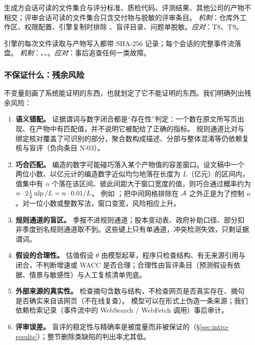 \begin{invariant}[信息隔离]
\label{inv:isolation}
生成方会话可读的文件集合与评分标准、质检代码、评测结果、其他公司的产物不相交；评审会话可读的文件集合只含交付物与脱敏的评审条目。
\emph{机制}：仓库外工作区、权限配置、引擎复制时排除 、盲评目录、问题单脱敏。\emph{应对}：T8、T9。
\end{invariant}

\begin{invariant}[可审计]
\label{inv:audit}
引擎的每次文件读取与产物写入都带 SHA-256 记录；每个会话的完整事件流落盘。
\emph{机制}：、、。\emph{应对}：事后追查任何一类故障。
\end{invariant}

\subsubsection{不保证什么：残余风险}
不变量刻画了系统能证明的东西，也就划定了它不能证明的东西。我们明确列出残余风险：

\begin{enumerate}[label=(R\arabic*)]
\item \textbf{语义错配。} 证据谓词与数字闭合都是“存在性”判定：一个数在原文所写页出现、在产物中有匹配值，并不说明它被配给了正确的指标。
      规则通道比对与绑定核对覆盖了可识别的部分，聚合数构成描述、分部与整体混淆等仍依赖复核与盲评（负向条目 N-03）。
\item \textbf{巧合匹配。} 编造的数字可能碰巧落入某个产物值的容差窗口。设文稿中一个两位小数、以亿元计的编造数字近似均匀地落在长度为 $L$（亿元）的区间内，
      值集中有 $n$ 个落在该区间、彼此间距大于窗口宽度的值，则巧合通过概率约为 $n\cdot 2\tfrac12\operatorname{ulp}/L = n\cdot 0.01/L$。
      例如 ；把中间网格排除在 $\mathcal{A}$ 之外正是为了控制 $n$。对一位小数或整数写法，窗口变宽，风险相应上升。
\item \textbf{规则通道的盲区。} 季报不进规则通道；股本变动表、政府补助口径、部分扣非季度别名规则通道取不到。这些键上只有单通道，冲突检测失效，只剩证据谓词。
\item \textbf{假设的合理性。} 估值假设 $\theta$ 由模型起草，程序只检查结构、有无来源引用与闭合，不判断增速或 WACC 是否合理；合理性由盲评条目（预测假设有依据、情景与敏感性）与人工复核清单兜底。
\item \textbf{外部来源的真实性。}  检查摘句含数与结构，不检查网页是否真实存在、摘句是否确实来自该网页（不在线复查）。
      模型可以在形式上伪造一条来源；我们依赖检索记录（事件流中的 WebSearch / WebFetch 调用）事后审计。
\item \textbf{评审误差。} 盲评的稳定性与精确率是被度量而非被保证的（\S\ref{sec:intro-results}）；整节删除类缺陷的判出率尤其低。
\end{enumerate}

